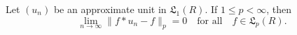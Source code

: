 Let $(u_n)$ be an approximate unit in $\mathfrak{L}_1(R)$. If $1 \leq p < \infty$, then
$$\lim_{n \to \infty} \|f * u_n - f\|_p = 0 \quad \text{for all} \quad f \in \mathfrak{L}_p(R).$$
